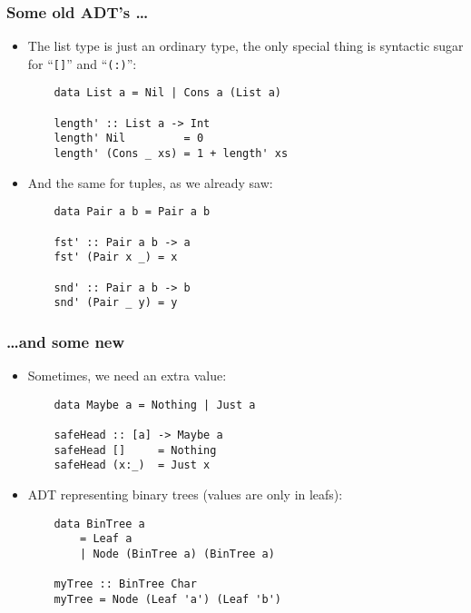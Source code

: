 \documentclass[final,handout]{beamer}
\begin{document}
\begin{frame}[fragile]
    \frametitle{Some old ADT's \dots}

    \begin{itemize}
        \item<1-> The list type is just an ordinary type, the only special thing is
            syntactic sugar for ``\texttt{[]}'' and ``\texttt{(:)}'':

            \begin{lstlisting}
    data List a = Nil | Cons a (List a)

    length' :: List a -> Int
    length' Nil         = 0
    length' (Cons _ xs) = 1 + length' xs
            \end{lstlisting}

        \item<2-> And the same for tuples, as we already saw:

            \begin{lstlisting}
    data Pair a b = Pair a b

    fst' :: Pair a b -> a
    fst' (Pair x _) = x

    snd' :: Pair a b -> b
    snd' (Pair _ y) = y
            \end{lstlisting}

    \end{itemize}
\end{frame}

\begin{frame}[fragile]
    \frametitle{\dots and some new}

    \begin{itemize}
        \item<1-> Sometimes, we need an extra value:
        \begin{lstlisting}
    data Maybe a = Nothing | Just a

    safeHead :: [a] -> Maybe a
    safeHead []     = Nothing
    safeHead (x:_)  = Just x
        \end{lstlisting}

    \item<2-> ADT representing binary trees (values are only in leafs):

        \begin{lstlisting}
    data BinTree a
        = Leaf a 
        | Node (BinTree a) (BinTree a)

    myTree :: BinTree Char
    myTree = Node (Leaf 'a') (Leaf 'b')
        \end{lstlisting}

    \end{itemize}
\end{frame}
\end{document}
